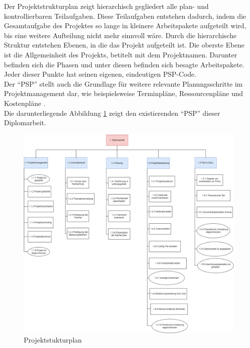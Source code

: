 Der Projektstrukturplan zeigt hierarchisch gegliedert alle plan- und kontrollierbaren Teilaufgaben. Diese Teilaufgaben entstehen dadurch, indem die Gesamtaufgabe des Projektes so lange in kleinere Arbeitspakete aufgeteilt wird, bis eine weitere Aufteilung nicht mehr sinnvoll wäre. Durch die hierarchische Struktur entstehen Ebenen, in die das Projekt aufgeteilt ist. Die oberste Ebene ist die Allgemeinheit des Projekts, betitelt mit dem Projektnamen. Darunter befinden sich die Phasen und unter diesen befinden sich besagte Arbeitspakete. Jeder dieser Punkte hat seinen eigenen, eindeutigen PSP-Code.
\\Der \enquote{PSP} stellt auch die Grundlage für weitere relevante Planungsschritte im Projektmanagement dar, wie beispielsweise Terminpläne, Ressourcenpläne und Kostenpläne \cite[vgl.][]{Kindl_Niels:2023}. \\
Die darunterliegende Abbildung \ref{fig:projektstrukturplan} zeigt den existierenden \enquote{PSP} dieser Diplomarbeit.

\begin{figure}[H]
	\centering
	\includegraphics[width=1\linewidth]{Bilder/projektstrukturplan.png}
	\caption{Projektstukturplan}
	\label{fig:projektstrukturplan}
\end{figure}